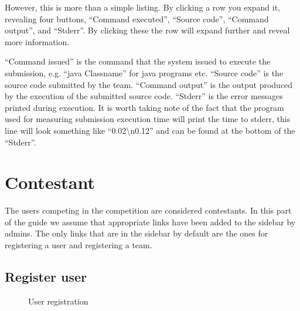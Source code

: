 \bigskip

However, this is more than a simple listing. By clicking a row you
expand it, revealing four buttons, {\textquotedblleft}Command
executed{\textquotedblright}, {\textquotedblleft}Source
code{\textquotedblright}, {\textquotedblleft}Command
output{\textquotedblright}, and
{\textquotedblleft}Stderr{\textquotedblright}. By clicking these the
row will expand further and reveal more information. 


\bigskip

{\textquotedblleft}Command issued{\textquotedblright} is the command
that the system issued to execute the submission, e.g.
{\textquotedblleft}java Classname{\textquotedblright} for java programs
etc. {\textquotedblleft}Source code{\textquotedblright} is the source
code submitted by the team. {\textquotedblleft}Command
output{\textquotedblright} is the output produced by the execution of
the submitted source code.
{\textquotedblleft}Stderr{\textquotedblright} is the error messages
printed during execution. It is worth taking note of the fact that the
program used for measuring submission execution time will print the
time to stderr, this line will look something like
{\textquotedblleft}0.02{\textbackslash}n0.12{\textquotedblright} and
can be found at the bottom of the
{\textquotedblleft}Stderr{\textquotedblright}. 


\section{Contestant}

The users competing in the competition are considered contestants. In
this part of the guide we assume that appropriate links have been added
to the sidebar by admins. The only links that are in the sidebar by
default are the ones for registering a user and registering a team.

\subsection{Register user}

\begin{figure}
\centering
	\caption{User registration}
	\label{fig:userReg}
\end{figure}

